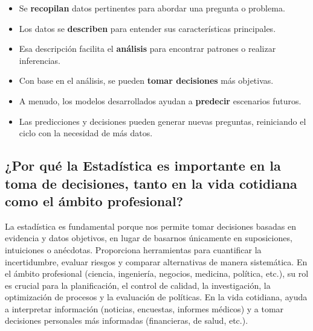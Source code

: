 \documentclass[12pt, letterpaper]{article}
\begin{document}
\begin{itemize}
    \item Se \textbf{recopilan} datos pertinentes para abordar una pregunta o problema.
    \item Los datos se \textbf{describen} para entender sus características principales.
    \item Esa descripción facilita el \textbf{análisis} para encontrar patrones o realizar inferencias.
    \item Con base en el análisis, se pueden \textbf{tomar decisiones} más objetivas.
    \item A menudo, los modelos desarrollados ayudan a \textbf{predecir} escenarios futuros.
    \item Las predicciones y decisiones pueden generar nuevas preguntas, reiniciando el ciclo con la necesidad de más datos.
\end{itemize}


\subsection{¿Por qué la Estadística es importante en la toma de decisiones, tanto en la vida cotidiana como el ámbito profesional?}
La estadística es fundamental porque nos permite tomar decisiones basadas en evidencia y datos objetivos, en lugar de basarnos únicamente en suposiciones, intuiciones o anécdotas. Proporciona herramientas para cuantificar la incertidumbre, evaluar riesgos y comparar alternativas de manera sistemática. En el ámbito profesional (ciencia, ingeniería, negocios, medicina, política, etc.), su rol es crucial para la planificación, el control de calidad, la investigación, la optimización de procesos y la evaluación de políticas. En la vida cotidiana, ayuda a interpretar información (noticias, encuestas, informes médicos) y a tomar decisiones personales más informadas (financieras, de salud, etc.).
\end{document}
